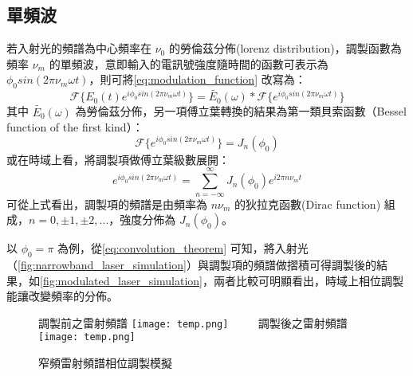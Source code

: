 \documentclass[class=NCU_thesis, crop=false]{standalone}
\begin{document}
\subsection{單頻波}
若入射光的頻譜為中心頻率在 $\nu_{0}$ 的勞倫茲分佈(lorenz distribution)，調製函數為頻率 $\nu_{m}$ 的單頻波，意即輸入的電訊號強度隨時間的函數可表示為 $\phi_{0} sin(2\pi \nu_{m} \omega t)$，則可將\cref{eq:modulation_function} 改寫為：
\begin{equation}
\label{eq:convolution_theorem}
    \mathscr{F}\{E_{0}(t)e^{i\phi_{0} sin(2\pi \nu_{m} \omega t)}\}=\tilde{E_{0}}(\omega)*\mathscr{F}\{{e^{i\phi_{0} sin(2\pi \nu_{m} \omega t)}}\}
\end{equation}
其中 $\tilde{E_{0}}(\omega)$ 為勞倫茲分佈，另一項傅立葉轉換的結果為第一類貝索函數（Bessel function of the first kind）：
\begin{equation}
    \mathscr{F}\{{e^{i\phi_{0} sin(2\pi \nu_{m} \omega t)}}\}=J_{n}(\phi_{0})
\end{equation}
或在時域上看，將調製項做傅立葉級數展開：
\begin{equation}
    e^{i\phi_{0} sin(2\pi \nu_{m} \omega t)}=\sum_{n=-\infty}^{\infty}J_{n}(\phi_{0})e^{i 2 \pi n \nu_{m} t}
\end{equation}
可從上式看出，調製項的頻譜是由頻率為 $n \nu_{m}$ 的狄拉克函數(Dirac function) 組成，$n=0, \pm1, \pm2, ...$，強度分佈為 $J_{n}(\phi_{0})$。

以 $\phi_{0}=\pi$ 為例，從\cref{eq:convolution_theorem} 可知，將入射光（\cref{fig:narrowband_laser_simulation}）與調製項的頻譜做摺積可得調製後的結果，如\cref{fig:modulated_laser_simulation}，兩者比較可明顯看出，時域上相位調製能讓改變頻率的分佈。


\begin{figure}[!hbt]
    \centering
    \subcaptionbox
        {調製前之雷射頻譜
        \label{fig:narrowband_laser_simulation}}
        {\texttt{[image: temp.png]}}
    ~~~~
    \subcaptionbox
        {調製後之雷射頻譜
        \label{fig:modulated_laser_simulation}}
        {\texttt{[image: temp.png]}}
    \caption{窄頻雷射頻譜相位調製模擬}
    \label{fig:single_photon_with_etalon}
\end{figure}

\end{document}
